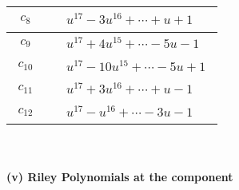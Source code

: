 \documentclass[1p]{elsarticle_modified}
\theoremstyle{definition}
\begin{document}
\begin{tabular}{m{50pt}|m{274pt}}
\hline $$\begin{aligned}c_{8}\end{aligned}$$&$\begin{aligned}
&u^{17}-3 u^{16}+\cdots+u+1
\end{aligned}$\\
\hline $$\begin{aligned}c_{9}\end{aligned}$$&$\begin{aligned}
&u^{17}+4 u^{15}+\cdots-5 u-1
\end{aligned}$\\
\hline $$\begin{aligned}c_{10}\end{aligned}$$&$\begin{aligned}
&u^{17}-10 u^{15}+\cdots-5 u+1
\end{aligned}$\\
\hline $$\begin{aligned}c_{11}\end{aligned}$$&$\begin{aligned}
&u^{17}+3 u^{16}+\cdots+u-1
\end{aligned}$\\
\hline $$\begin{aligned}c_{12}\end{aligned}$$&$\begin{aligned}
&u^{17}- u^{16}+\cdots-3 u-1
\end{aligned}$\\
\hline
\end{tabular}\\~\\
\newpage\renewcommand{\arraystretch}{1}
\flushleft \textbf{(v) Riley Polynomials at the component}\newline \\
\end{document}
